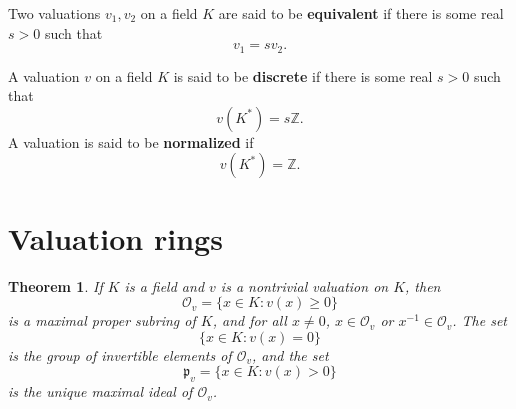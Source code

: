 \documentclass{article}
\newtheorem{theorem}{Theorem}
\theoremstyle{definition}
\begin{document}
Two valuations $v_1,v_2$ on a field $K$ are said to be \textbf{equivalent} if there is some
real $s>0$ such that
\[
v_1=sv_2.
\]

A valuation $v$ on a field $K$ is said to be \textbf{discrete} if there is some real $s>0$ such that
\[
v(K^*) = s\mathbb{Z}.
\]
A valuation is said to be \textbf{normalized} if
\[
v(K^*)=\mathbb{Z}.
\]


\section{Valuation rings}
\begin{theorem}
If $K$ is a field and $v$ is a nontrivial valuation on $K$, then 
\[
\mathcal{O}_v = \{x \in K: v(x) \geq 0\}
\]
is a maximal proper subring of $K$, and for all $x \neq 0$, $x \in \mathcal{O}_v$ or $x^{-1} \in
\mathcal{O}_v$. The set
\[
\{x \in K: v(x)=0\}
\]
is the group of invertible elements of $\mathcal{O}_v$, and the set 
\[
\mathfrak{p}_v=\{x \in K: v(x)>0\}
\]
is the unique maximal ideal  of $\mathcal{O}_v$.
\label{valring}
\end{theorem}
\end{document}
